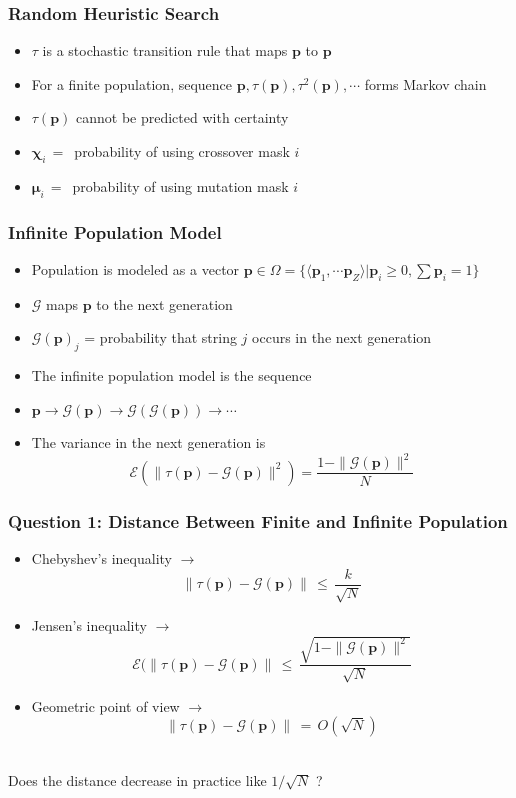 \documentclass[aspectratio=169]{beamer}
\begin{document}
  \begin{frame}
    \frametitle{Random Heuristic Search}
    \begin{itemize}
      \item{$\tau$ is a stochastic transition rule that maps $\bm{p}$ to $\bm{p}$}
      \item{For a finite population, sequence $\bm{p}, \tau(\bm{p}), \tau^2(\bm{p}), \cdots $ forms Markov chain}
      \item{$\tau(\bm{p})$ cannot be predicted with certainty }      
      \item{$\bm{\chi}_i \,=\,$ probability of using crossover mask $i$ }
      \item{$\bm{\mu}_i \,=\,$ probability of using mutation mask $i$ }
    \end{itemize}
  \end{frame}
  
  \begin{frame}
    \frametitle{Infinite Population Model}
    \begin{itemize}
      \item{Population is modeled as a vector $\bm{p} \in \Omega = \{\langle \bm{p}_1, \cdots \bm{p}_Z \rangle | \bm{p}_i \geq 0, \sum \bm{p}_i = 1 \}$}
      \item{$\mathcal{G}$ maps $\bm{p}$ to the next generation}
      \item{$\mathcal{G}(\bm{p})_j$ =  probability that string $j$ occurs in the next generation}
      \item{The infinite population model is the sequence }
      \item{$\bm{p} \to \mathcal{G}(\bm{p}) \to  {\mathcal{G}}(\mathcal{G}(\bm{p})) \to \cdots $}
      \item{The variance in the next generation  is
	\[\mathcal{E}(\| \tau (\bm{p}) - \mathcal{G}(\bm{p}) \|^2) = \frac{1 - \|\mathcal{G}(\bm{p})\|^2}{N}\]
      }
    \end{itemize}  
  \end{frame}  
  
  
  \begin{frame}
    \frametitle{Question 1: Distance Between Finite and Infinite Population}
    \begin{itemize}
      \item{Chebyshev's inequality $\to$ \[ \| \tau (\bm{p}) - \mathcal{G}(\bm{p}) \| \,\leq\, \frac{k}{\sqrt{N}} \] }
      \item{Jensen's inequality  
      $\to$ \[ \mathcal{E}(\| \tau (\bm{p}) - \mathcal{G}(\bm{p}) \| \,\leq\, \frac{\sqrt{1 - \|\mathcal{G}(\bm{p})\|^2}}{\sqrt{N}}\]}
      \item{Geometric point of view $\to$ \[ \| \tau (\bm{p}) - \mathcal{G}(\bm{p}) \| \,=\, O(\sqrt{N}) \] }      
    \end{itemize}
      \mbox{}\\[0.25 in]
    Does the distance decrease in practice like $1/\sqrt{N}$ ?
  \end{frame}
  
\end{document}
